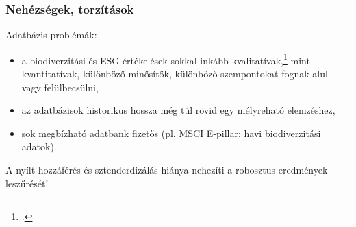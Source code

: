\documentclass[aspectratio=169,notheorems]{corvinusmetropolis}
\begin{document}
\begin{frame}
  \frametitle{Nehézségek, torzítások}
  \begin{block}{Adatbázis problémák:}
  \begin{itemize}
    \item a \alert{biodiverzitási és ESG értékelések sokkal inkább kvalitatívak},\footcite{berg_aggregate_2022} mint kvantitatívak, \alert{különböző minősítők, különböző szempontokat fognak alul- vagy felülbecsülni},
    \item az \alert{adatbázisok historikus hossza még túl rövid} egy mélyreható elemzéshez,
    \item sok megbízható adatbank fizetős (pl. MSCI E-pillar: havi biodiverzitási adatok).
  \end{itemize}
  \end{block}
  A nyílt hozzáférés és sztenderdizálás hiánya nehezíti a robosztus eredmények leszűrését!
\end{frame}


\end{document}
